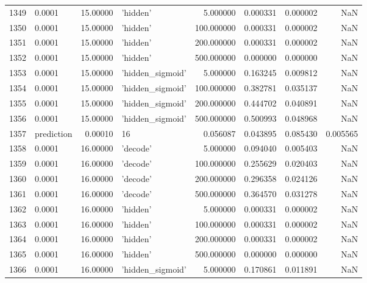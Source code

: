 \documentclass[10pt,a4paper]{article}
\begin{document}
\begin{tabular}{llrlrrrr}
1349 &      0.0001 &  15.00000 &           'hidden' &    5.000000 &  0.000331 &  0.000002 &       NaN \\
1350 &      0.0001 &  15.00000 &           'hidden' &  100.000000 &  0.000331 &  0.000002 &       NaN \\
1351 &      0.0001 &  15.00000 &           'hidden' &  200.000000 &  0.000331 &  0.000002 &       NaN \\
1352 &      0.0001 &  15.00000 &           'hidden' &  500.000000 &  0.000000 &  0.000000 &       NaN \\
1353 &      0.0001 &  15.00000 &   'hidden\_sigmoid' &    5.000000 &  0.163245 &  0.009812 &       NaN \\
1354 &      0.0001 &  15.00000 &   'hidden\_sigmoid' &  100.000000 &  0.382781 &  0.035137 &       NaN \\
1355 &      0.0001 &  15.00000 &   'hidden\_sigmoid' &  200.000000 &  0.444702 &  0.040891 &       NaN \\
1356 &      0.0001 &  15.00000 &   'hidden\_sigmoid' &  500.000000 &  0.500993 &  0.048968 &       NaN \\
1357 &  prediction &   0.00010 &                 16 &    0.056087 &  0.043895 &  0.085430 &  0.005565 \\
1358 &      0.0001 &  16.00000 &           'decode' &    5.000000 &  0.094040 &  0.005403 &       NaN \\
1359 &      0.0001 &  16.00000 &           'decode' &  100.000000 &  0.255629 &  0.020403 &       NaN \\
1360 &      0.0001 &  16.00000 &           'decode' &  200.000000 &  0.296358 &  0.024126 &       NaN \\
1361 &      0.0001 &  16.00000 &           'decode' &  500.000000 &  0.364570 &  0.031278 &       NaN \\
1362 &      0.0001 &  16.00000 &           'hidden' &    5.000000 &  0.000331 &  0.000002 &       NaN \\
1363 &      0.0001 &  16.00000 &           'hidden' &  100.000000 &  0.000331 &  0.000002 &       NaN \\
1364 &      0.0001 &  16.00000 &           'hidden' &  200.000000 &  0.000331 &  0.000002 &       NaN \\
1365 &      0.0001 &  16.00000 &           'hidden' &  500.000000 &  0.000000 &  0.000000 &       NaN \\
1366 &      0.0001 &  16.00000 &   'hidden\_sigmoid' &    5.000000 &  0.170861 &  0.011891 &       NaN \\

\end{tabular}
\end{document}
